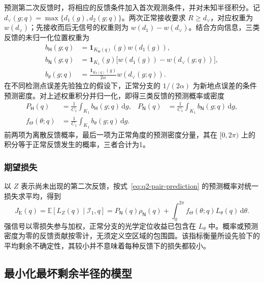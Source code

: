 \documentclass[UTF8,a4paper,zihao=-4,fontset=none]{ctexart}
\begin{document}
预测第二次反馈时，将相应的反馈条件加入首次观测条件，并对未知半径积分。记 \(d_\vee(g;q)=\max\{d_1(g),d_2(g;q)\}\)。两次正常接收要求 \(R\ge d_\vee\)，对应权重为 \(w(d_\vee)\)；先接收而后无信号的权重则为 \(w(d_1)-w(d_\vee)\)。结合方向信息，三类反馈的未归一化位置权重为
\begin{equation}
\begin{aligned}
 b_{\mathsf H}(g;q)&=\mathbf1_{K_{\mathsf H}(q)}(g)w(d_1(g)),\\
 b_{\mathsf N}(g;q)&=\mathbf1_{K_1}(g)\bigl[w(d_1(g))-w(d_\vee(g;q))\bigr],\\
 b_\theta(g;q)&=\frac{\mathbf1_{K_\theta(q)}(g)}{2\alpha}w(d_\vee(g;q)).
\end{aligned}
\label{eq:q2-pair-feedback-weights}
\end{equation}
在不同检测点误差先验独立的假设下，正常分支的 \(1/(2\alpha)\) 为新地点误差的条件预测密度。对上述权重积分并归一化，即得三类反馈的预测概率或密度
\begin{equation}
\begin{aligned}
 P_{\mathsf H}(q)&=\frac{1}{C_1}\int_{K_1}b_{\mathsf H}(g;q)\,\mathrm dg,
 &P_{\mathsf N}(q)&=\frac{1}{C_1}\int_{K_1}b_{\mathsf N}(g;q)\,\mathrm dg,\\
 f_\Theta(\theta;q)&=\frac{1}{C_1}\int_{K_1}b_\theta(g;q)\,\mathrm dg.
\end{aligned}
\label{eq:q2-pair-prediction}
\end{equation}
前两项为离散反馈概率，最后一项为正常角度的预测密度分量，其在 \([0,2\pi)\) 上的积分等于正常反馈发生的概率，三者合计为1。

\subsubsection{期望损失}

以 \(Z\) 表示尚未出现的第二次反馈，按式~\eqref{eq:q2-pair-prediction} 的预测概率对统一损失求平均，得到
\begin{equation}
 J_{\mathrm E}(q)=\mathbb E[L_Z(q)\mid\mathcal I_1,q]
 =P_{\mathsf N}(q)\rho_{\mathsf N}(q)
 +\int_0^{2\pi}f_\Theta(\theta;q)L_\theta(q)\,\mathrm d\theta.
\label{eq:q2-pair-expected-objective}
\end{equation}
强信号以零损失参与加权，正常分支的光学定位收益已包含在 \(L_\theta\) 中。概率或预测密度为零的反馈贡献按零计，无须定义空区域的包围圆。该指标衡量所设先验下的平均剩余不确定性，其较小并不意味着每种反馈下的损失都较小。

\subsection{最小化最坏剩余半径的模型}
\end{document}
